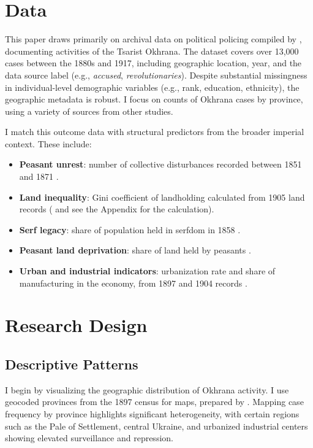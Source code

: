 \documentclass[11pt]{scrarticle}
\begin{document}
\section{Data}

This paper draws primarily on archival data on political policing compiled by \cite{grigoriadis_data_2024}, documenting activities of the Tsarist Okhrana. The dataset covers over 13,000 cases between the 1880s and 1917, including geographic location, year, and the data source label (e.g., \textit{accused}, \textit{revolutionaries}). Despite substantial missingness in individual-level demographic variables (e.g., rank, education, ethnicity), the geographic metadata is robust. I focus on counts of Okhrana cases by province, using a variety of sources from other studies.

I match this outcome data with structural predictors from the broader imperial context. These include:

\begin{itemize}
    \item \textbf{Peasant unrest}: number of collective disturbances recorded between 1851 and 1871 \cite{finkel_does_2015}.
    \item \textbf{Land inequality}: Gini coefficient of landholding calculated from 1905 land records (\cite{lindert_russian_2014} and see the Appendix for the calculation).
    \item \textbf{Serf legacy}: share of population held in serfdom in 1858 \cite{markevich_economic_2018}.
    \item \textbf{Peasant land deprivation}: share of land held by peasants \parencite{lindert_russian_2014}.
    \item \textbf{Urban and industrial indicators}: urbanization rate and share of manufacturing in the economy, from 1897 and 1904 records \parencite{lindert_russian_2014}.
\end{itemize}

\section{Research Design}

\subsection{Descriptive Patterns}

I begin by visualizing the geographic distribution of Okhrana activity. I use geocoded provinces from the 1897 census for maps, prepared by \cite{kessler_electronic_2020}. Mapping case frequency by province highlights significant heterogeneity, with certain regions such as the Pale of Settlement, central Ukraine, and urbanized industrial centers showing elevated surveillance and repression. 
\end{document}
